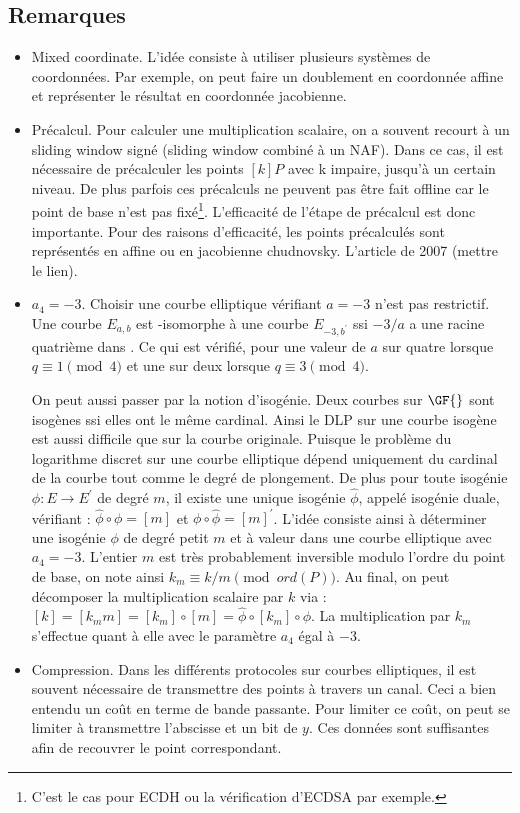 \subsection{Remarques}
\begin{itemize}[label=$\bullet$]
    \item Mixed coordinate. L'idée consiste à utiliser plusieurs systèmes de coordonnées. Par exemple, on peut faire un doublement en coordonnée affine et représenter le résultat en coordonnée jacobienne.
    \item Précalcul. Pour calculer une multiplication scalaire, on a souvent recourt à un sliding window signé (sliding window combiné à un NAF). Dans ce cas, il est nécessaire de précalculer les points $[k]P$ avec k impaire, jusqu'à un certain niveau. De plus parfois ces précalculs ne peuvent pas être fait offline car le point de base n'est pas fixé\footnote{C'est le cas pour ECDH ou la vérification d'ECDSA par exemple.}. L'efficacité de l'étape de précalcul est donc importante. Pour des raisons d'efficacité, les points précalculés sont représentés en affine ou en jacobienne chudnovsky. L'article de 2007 (mettre le lien).%
    \item $a_4 = -3$. Choisir une courbe elliptique vérifiant $a = -3$ n'est pas restrictif. Une courbe $E_{a, b}$ est -isomorphe à une courbe $E_{-3, b^{'}}$ ssi $-3/a$ a une racine quatrième dans . Ce qui est vérifié, pour une valeur de $a$ sur quatre lorsque $q \equiv 1 \pmod 4$ et une sur deux lorsque $q \equiv 3 \pmod 4$.

On peut aussi passer par la notion d'isogénie. Deux courbes sur $\GF{}$ sont isogènes ssi elles ont le même cardinal. Ainsi le DLP sur une courbe isogène est aussi difficile que sur la courbe originale. Puisque le problème du logarithme discret sur une courbe elliptique dépend uniquement du cardinal de la courbe tout comme le degré de plongement. De plus pour toute isogénie $\phi : E \to E^{'}$ de degré $m$, il existe une unique isogénie $\hat{\phi}$, appelé isogénie duale, vérifiant : $\hat{\phi} \circ \phi = [m]$ et $\phi \circ \hat{\phi} = [m]^{'}$. L'idée consiste ainsi à déterminer une  isogénie $\phi$ de degré petit $m$ et à valeur dans une courbe elliptique avec $a_4 = -3$. L'entier $m$ est très probablement inversible modulo l'ordre du point de base, on note ainsi $k_m \equiv k/m \pmod{ord(P)}$. Au final, on peut décomposer la multiplication scalaire par $k$ via : $[k] = [k_m m] = [k_m] \circ [m] = \hat{\phi} \circ [k_m] \circ \phi$. La multiplication par $k_m$ s'effectue quant à elle avec le paramètre $a_4$ égal à $-3$. 
    \item Compression. Dans les différents protocoles sur courbes elliptiques, il est souvent nécessaire de transmettre des points à travers un canal. Ceci a bien entendu un coût en terme de bande passante. Pour limiter ce coût, on peut se limiter à transmettre l'abscisse et un bit de $y$. Ces données sont suffisantes afin de recouvrer le point correspondant. 
\end{itemize}



